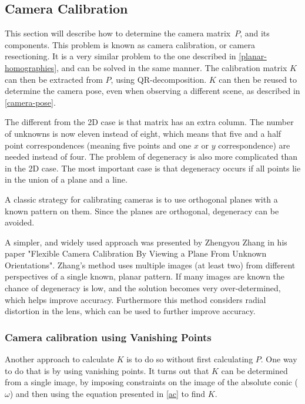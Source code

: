 \subsection{Camera Calibration} \label{camera-calibration}
This section will describe how to determine the camera matrix $P$, and its components.
This problem is known as camera calibration, or camera resectioning.
It is a very similar problem to the one described in \ref{planar-homographies}, and can be solved in the same manner.	
The calibration matrix $K$ can then be extracted from $P$, using QR-decomposition.\cite{wiki:qr-decomposition}
$K$ can then be reused to determine the camera pose, even when observing a different scene, as described in \ref{camera-pose}.

The different from the 2D case is that matrix has an extra column. The number of unknowns is now eleven instead of eight, which means that five and a half point correspondences (meaning five points and one $x$ or $y$ correspondence) are needed instead of four.
The problem of degeneracy is also more complicated than in the 2D case.
The most important case is that degeneracy occurs if all points lie in the union of a plane and a line. \cite[179-180]{hartley-zisserman}

A classic strategy for calibrating cameras is to use orthogonal planes with a known pattern on them. 
Since the planes are orthogonal, degeneracy can be avoided.

A simpler, and widely used approach was presented by Zhengyou Zhang in his paper "Flexible Camera Calibration By Viewing a Plane From Unknown Orientations".
Zhang's method uses multiple images (at least two) from different perspectives of a single known, planar pattern.
If many images are known the chance of degeneracy is low, and  the solution becomes very over-determined, which helps improve accuracy.
Furthermore this method considers radial distortion in the lens, which can be used to further improve accuracy. \cite{zhang-calibration}

\subsubsection{Camera calibration using Vanishing Points}
Another approach to calculate $K$ is to do so without first calculating $P$.
One way to do that is by using vanishing points. %
It turns out that $K$ can be determined from a single image, by imposing constraints on the image of the absolute conic ($\omega$) and then using the equation presented in \ref{ac} to find $K$.

